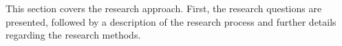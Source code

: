 This section covers the research approach. First, the research questions are
presented, followed by a description of the research process and further details
regarding the research methods.
